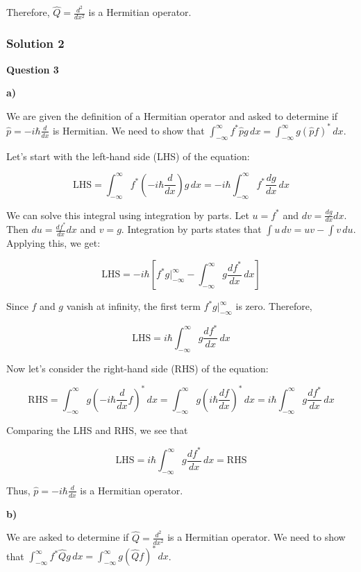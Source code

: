 \documentclass{article}
\begin{document}
Therefore, $\hat{Q} = \frac{d^2}{dx^2}$ is a Hermitian operator.

\subsubsection{Solution 2}

\textbf{Question 3}

\textbf{a)}

We are given the definition of a Hermitian operator and asked to determine if  $\hat{p} = -i\hbar \frac{d}{dx}$ is Hermitian.  We need to show that $\int_{-\infty}^{\infty} f^* \hat{p} g \, dx = \int_{-\infty}^{\infty} g (\hat{p} f)^* \, dx$.

Let's start with the left-hand side (LHS) of the equation:

\[
\text{LHS} = \int_{-\infty}^{\infty} f^* \left(-i\hbar \frac{d}{dx}\right) g \, dx = -i\hbar \int_{-\infty}^{\infty} f^* \frac{dg}{dx} \, dx
\]

We can solve this integral using integration by parts. Let $u = f^*$ and $dv = \frac{dg}{dx}dx$. Then $du = \frac{df^*}{dx} dx$ and $v = g$. Integration by parts states that $\int u \, dv = uv - \int v \, du$. Applying this, we get:

\[
\text{LHS} = -i\hbar \left[ f^* g \Big|_{-\infty}^{\infty} - \int_{-\infty}^{\infty} g \frac{df^*}{dx} \, dx \right]
\]

Since $f$ and $g$ vanish at infinity, the first term $f^* g \Big|_{-\infty}^{\infty}$ is zero. Therefore,

\[
\text{LHS} = i\hbar \int_{-\infty}^{\infty} g \frac{df^*}{dx} \, dx
\]

Now let's consider the right-hand side (RHS) of the equation:

\[
\text{RHS} = \int_{-\infty}^{\infty} g \left(-i\hbar \frac{d}{dx} f\right)^* \, dx = \int_{-\infty}^{\infty} g \left(i\hbar \frac{df}{dx}\right)^* \, dx = i\hbar \int_{-\infty}^{\infty} g \frac{df^*}{dx} \, dx
\]

Comparing the LHS and RHS, we see that

\[
\text{LHS} = i\hbar \int_{-\infty}^{\infty} g \frac{df^*}{dx} \, dx = \text{RHS}
\]

Thus, $\hat{p} = -i\hbar \frac{d}{dx}$ is a Hermitian operator.

\textbf{b)}

We are asked to determine if $\hat{Q} = \frac{d^2}{dx^2}$ is a Hermitian operator. We need to show that $\int_{-\infty}^{\infty} f^* \hat{Q} g \, dx = \int_{-\infty}^{\infty} g (\hat{Q} f)^* \, dx$.
\end{document}
